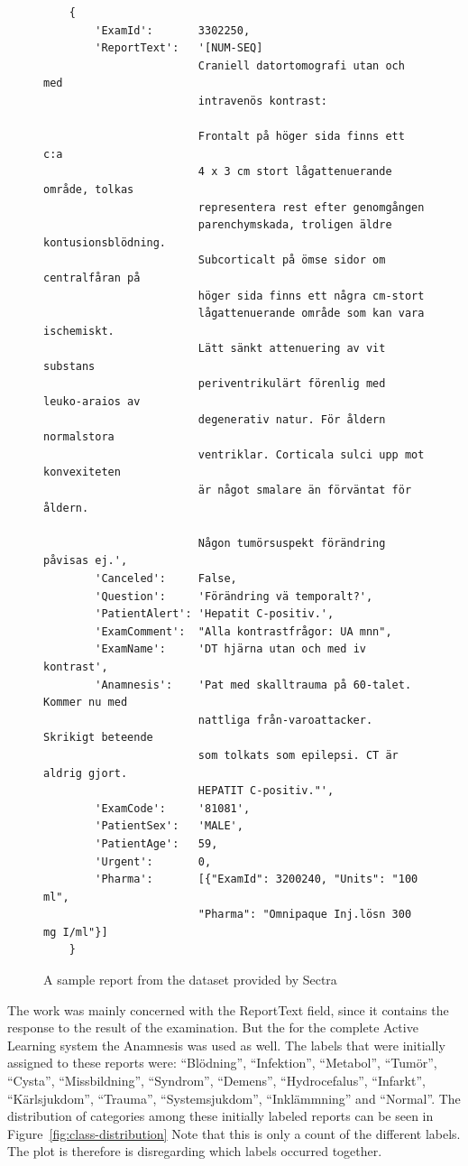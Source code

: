\begin{figure}
\begin{verbatim}
    {
        'ExamId':       3302250, 
        'ReportText':   '[NUM-SEQ] 
                        Craniell datortomografi utan och med 
                        intravenös kontrast:
                        
                        Frontalt på höger sida finns ett c:a 
                        4 x 3 cm stort lågattenuerande område, tolkas 
                        representera rest efter genomgången 
                        parenchymskada, troligen äldre kontusionsblödning. 
                        Subcorticalt på ömse sidor om centralfåran på 
                        höger sida finns ett några cm-stort 
                        lågattenuerande område som kan vara ischemiskt. 
                        Lätt sänkt attenuering av vit substans 
                        periventrikulärt förenlig med leuko-araios av 
                        degenerativ natur. För åldern normalstora 
                        ventriklar. Corticala sulci upp mot konvexiteten 
                        är något smalare än förväntat för åldern. 
                        
                        Någon tumörsuspekt förändring påvisas ej.',
        'Canceled':     False, 
        'Question':     'Förändring vä temporalt?',
        'PatientAlert': 'Hepatit C-positiv.', 
        'ExamComment':  "Alla kontrastfrågor: UA mnn", 
        'ExamName':     'DT hjärna utan och med iv kontrast',
        'Anamnesis':    'Pat med skalltrauma på 60-talet. Kommer nu med 
                        nattliga från-varoattacker. Skrikigt beteende 
                        som tolkats som epilepsi. CT är aldrig gjort. 
                        HEPATIT C-positiv."',
        'ExamCode':     '81081', 
        'PatientSex':   'MALE', 
        'PatientAge':   59, 
        'Urgent':       0, 
        'Pharma':       [{"ExamId": 3200240, "Units": "100 ml", 
                        "Pharma": "Omnipaque Inj.lösn 300 mg I/ml"}]
    }
\end{verbatim}
\caption{A sample report from the dataset provided by Sectra}
\label{fig:sample-report}
\end{figure}

The work was mainly concerned with the ReportText field, since it contains the response to the result of the examination.
But the for the complete Active Learning system the Anamnesis was used as well.
The labels that were initially assigned to these reports were:
``Blödning'', ``Infektion'', ``Metabol'', ``Tumör'', ``Cysta'', ``Missbildning'', ``Syndrom'', ``Demens'', ``Hydrocefalus'', ``Infarkt'', ``Kärlsjukdom'', ``Trauma'', ``Systemsjukdom'', ``Inklämmning'' and ``Normal''.
The distribution of categories among these initially labeled reports can be seen in Figure~\ref{fig:class-distribution}
Note that this is only a count of the different labels.
The plot is therefore is disregarding which labels occurred together.

